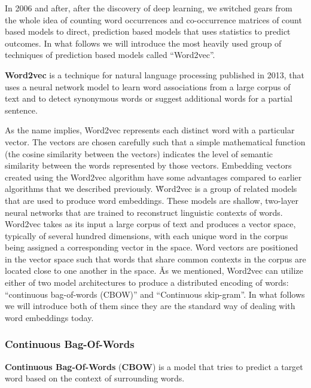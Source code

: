 In 2006 and after, after the discovery of deep learning, we switched gears from the whole idea of counting word
occurrences and co-occurrence matrices of count based models to direct, prediction based models that uses statistics
to predict outcomes. In what follows we will introduce the most heavily used group of techniques of prediction based
models called ``Word2vec''.

\textbf{Word2vec} is a technique for natural language processing published in 2013, that uses a neural network model to
learn word associations from a large corpus of text and to detect synonymous words or suggest additional words for a
partial sentence.
\ed

As the name implies, Word2vec represents each distinct word with a particular vector. The vectors are chosen
carefully such that a simple mathematical function (the cosine similarity between the vectors) indicates the level
of semantic similarity between the words represented by those vectors. Embedding vectors created using the Word2vec
algorithm have some advantages compared to earlier algorithms that we described previously. \v

Word2vec is a group of related models that are used to produce word embeddings. These models are shallow, two-layer
neural networks that are trained to reconstruct linguistic contexts of words. Word2vec takes as its input a large
corpus of text and produces a vector space, typically of several hundred dimensions, with each unique word in the
corpus being assigned a corresponding vector in the space. Word vectors are positioned in the vector space such that
words that share common contexts in the corpus are located close to one another in the space. \v

As we mentioned, Word2vec can utilize either of two model architectures to produce a distributed encoding of words:
``continuous bag-of-words (CBOW)'' and ``Continuous skip-gram''. In what follows we will introduce both of them since
they are the standard way of dealing with word embeddings today.

\subsubsection{Continuous Bag-Of-Words}

\textbf{Continuous Bag-Of-Words} (\textbf{CBOW}) is a model that tries to predict a target word based on the context of
surrounding words.
\ed

